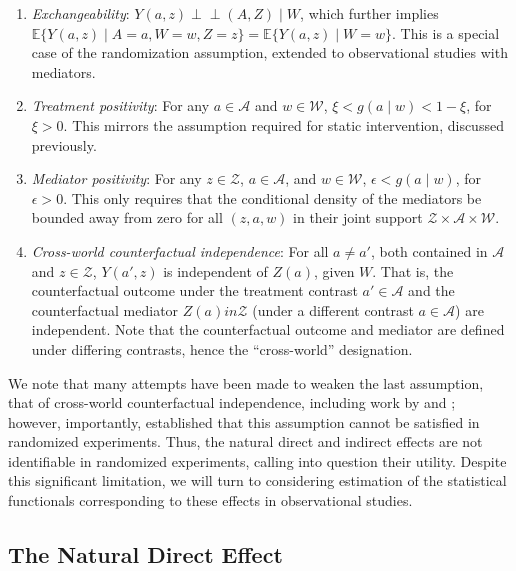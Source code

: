 \documentclass[12pt, krantz2,]{krantz}
\providecommand{\tightlist}{%
  \setlength{\itemsep}{0pt}\setlength{\parskip}{0pt}}
\theoremstyle{definition}
\theoremstyle{definition}
\theoremstyle{definition}
\newcommand{\E}{\mathbb{E}}
\newcommand{\1}{\mathbbm{1}}
\newcommand{\indep}{\mbox{$\perp\!\!\!\perp$}}
\begin{document}
\begin{enumerate}
\def\labelenumi{\arabic{enumi}.}
\tightlist
\item
  \emph{Exchangeability}: \(Y(a, z) \indep (A, Z) \mid W\), which further implies
  \(\E\{Y(a, z) \mid A=a, W=w, Z=z\} = \E\{Y(a, z) \mid W=w\}\). This is a
  special case of the randomization assumption, extended to observational
  studies with mediators.
\item
  \emph{Treatment positivity}: For any \(a \in \mathcal{A}\) and \(w \in \mathcal{W}\), \(\xi < g(a \mid w) < 1 - \xi\), for \(\xi > 0\). This mirrors the
  assumption required for static intervention, discussed previously.
\item
  \emph{Mediator positivity}: For any \(z \in \mathcal{Z}\), \(a \in \mathcal{A}\), and
  \(w \in \mathcal{W}\), \(\epsilon < g(a \mid w)\), for \(\epsilon > 0\). This only
  requires that the conditional density of the mediators be bounded away from
  zero for all \((z, a, w)\) in their joint support \(\mathcal{Z} \times \mathcal{A} \times \mathcal{W}\).
\item
  \emph{Cross-world counterfactual independence}: For all \(a \neq a'\), both
  contained in \(\mathcal{A}\) and \(z \in \mathcal{Z}\), \(Y(a', z)\) is independent
  of \(Z(a)\), given \(W\). That is, the counterfactual outcome under the treatment
  contrast \(a' \in \mathcal{A}\) and the counterfactual mediator \(Z(a) in \mathcal{Z}\) (under a different contrast \(a \in \mathcal{A}\)) are
  independent. Note that the counterfactual outcome and mediator are defined
  under differing contrasts, hence the ``cross-world'' designation.
\end{enumerate}

We note that many attempts have been made to weaken the last assumption, that of
cross-world counterfactual independence, including work by
\citet{petersen2006estimation} and \citet{imai2010identification}; however, importantly,
\citet{robins2010alternative} established that this assumption cannot be satisfied in
randomized experiments. Thus, the natural direct and indirect effects are not
identifiable in randomized experiments, calling into question their utility.
Despite this significant limitation, we will turn to considering estimation of
the statistical functionals corresponding to these effects in observational
studies.

\hypertarget{the-natural-direct-effect}{%
\subsection{The Natural Direct Effect}\label{the-natural-direct-effect}}
\end{document}
